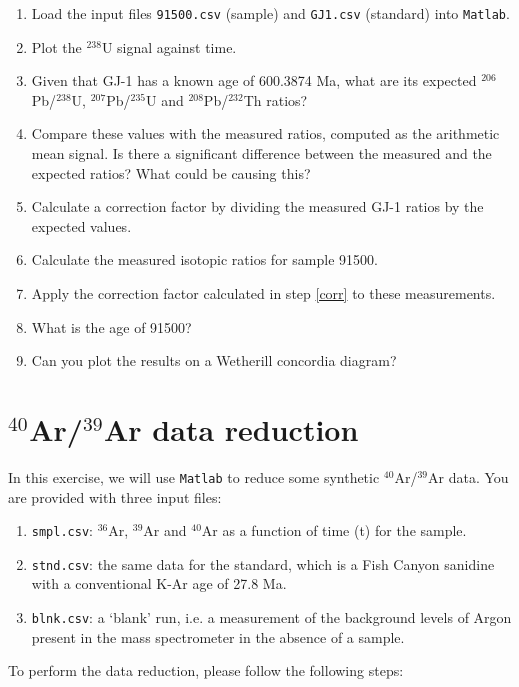 \documentclass{book}
\begin{document}
\begin{enumerate}
\item Load the input files {\tt 91500.csv} (sample) and {\tt GJ1.csv}
  (standard) into {\tt Matlab}.
\item Plot the $^{238}$U signal against time.
\item Given that GJ-1 has a known age of 600.3874 Ma, what are its
  expected $^{206}$Pb/$^{238}$U, $^{207}$Pb/$^{235}$U and
  $^{208}$Pb/$^{232}$Th ratios?
\item Compare these values with the measured ratios, computed as the
  arithmetic mean signal.  Is there a significant difference between
  the measured and the expected ratios? What could be causing this?
\item Calculate a correction factor by dividing the measured GJ-1
  ratios by the expected values. \label{corr}
\item Calculate the measured isotopic ratios for sample 91500.
\item Apply the correction factor calculated in step \ref{corr} to
  these measurements.
\item What is the age of 91500?
\item Can you plot the results on a Wetherill concordia diagram?
\end{enumerate}


\section{$^{40}$Ar/$^{39}$Ar data reduction}
\label{sec:Ar-Ar-R}

In this exercise, we will use {\tt Matlab} to reduce some synthetic
$^{40}$Ar/$^{39}$Ar data. You are provided with three input files:
\begin{enumerate}
\item{\tt smpl.csv}: $^{36}$Ar, $^{39}$Ar and $^{40}$Ar as a function
  of time (t) for the sample.
\item{\tt stnd.csv}: the same data for the standard, which is a Fish
  Canyon sanidine with a conventional K-Ar age of 27.8 Ma.
\item{\tt blnk.csv}: a `blank' run, i.e. a measurement of the
  background levels of Argon present in the mass spectrometer in the
  absence of a sample.
\end{enumerate}

To perform the data reduction, please follow the following steps:
\end{document}

